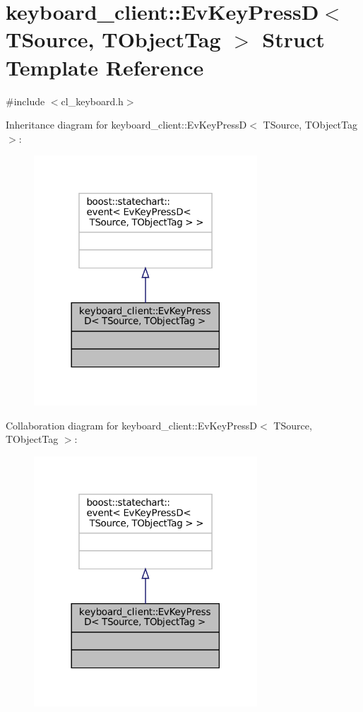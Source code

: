 \hypertarget{structkeyboard__client_1_1EvKeyPressD}{}\section{keyboard\+\_\+client\+:\+:Ev\+Key\+PressD$<$ T\+Source, T\+Object\+Tag $>$ Struct Template Reference}
\label{structkeyboard__client_1_1EvKeyPressD}


{\ttfamily \#include $<$cl\+\_\+keyboard.\+h$>$}



Inheritance diagram for keyboard\+\_\+client\+:\+:Ev\+Key\+PressD$<$ T\+Source, T\+Object\+Tag $>$\+:
\nopagebreak
\begin{figure}[H]
\begin{center}
\leavevmode
\includegraphics[width=237pt]{structkeyboard__client_1_1EvKeyPressD__inherit__graph}
\end{center}
\end{figure}


Collaboration diagram for keyboard\+\_\+client\+:\+:Ev\+Key\+PressD$<$ T\+Source, T\+Object\+Tag $>$\+:
\nopagebreak
\begin{figure}[H]
\begin{center}
\leavevmode
\includegraphics[width=237pt]{structkeyboard__client_1_1EvKeyPressD__coll__graph}
\end{center}
\end{figure}


